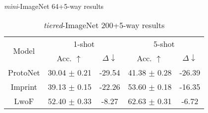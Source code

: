 \iflatexml
\begin{table}[t]
\vspace{-0.3in}
\begin{minipage}[t]{0.49\textwidth}
\begin{small}
\begin{center}
\caption{\textit{mini}-ImageNet 64+5-way results}
\vspace{-0.1in}
\label{tab:fewshot1}
\end{center}
\end{small}
\end{minipage}
\hfill
\begin{minipage}[t]{0.49\textwidth}
\begin{small}
\begin{center}
\caption{\textit{tiered}-ImageNet 200+5-way results}
\vspace{-0.1in}
\label{tab:fewshot2}
\begin{tabular}{c|cc|cc}
\toprule
\multirow{2}{*}{Model} & \multicolumn{2}{c|}{1-shot} & \multicolumn{2}{c}{5-shot}  \\
 & Acc. $\uparrow$ & $\Delta \downarrow$ & Acc. $\uparrow$ & $\Delta \downarrow$    \\
\midrule
ProtoNet  & 30.04 $\pm$ 0.21 & -29.54 & 41.38 $\pm$ 0.28 & -26.39      \\
Imprint   & 39.13 $\pm$ 0.15 & -22.26 & 53.60 $\pm$ 0.18 & -16.35 \\
LwoF      & 52.40 $\pm$ 0.33 & -8.27  & 62.63 $\pm$ 0.31 & -6.72            \\

\end{tabular}
\end{center}
\end{small}
\end{minipage}
\end{table}
